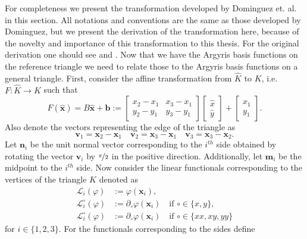 For completeness we present the transformation developed by Dominguez et. al. in
this section. All notations and conventions are the same as those developed by
Dominguez, but we present the derivation of the transformation here, because of
the novelty and importance of this transformation to this thesis. For the
original derivation one should see \cite{Dominguez06} and \cite{Dominguez08}.
Now that we have the Argyris basis functions on the reference triangle we need
to relate those to the Argyris basis functions on a general triangle. First,
consider the affine transformation from $\hat{K}$ to $K$, i.e. $F: \hat{K} \to
K$ such that
\begin{equation}
  F(\hat{\mathbf{x}}) = B\hat{\mathbf{x}} + \mathbf{b} :=
  \begin{bmatrix}
    x_2 - x_1 & x_3 - x_1 \\ y_2 - y_1 & y_3 - y_1
  \end{bmatrix} \begin{bmatrix}
    \hat{x} \\ \hat{y}
  \end{bmatrix} + \begin{bmatrix}
    x_1 \\ y_1
  \end{bmatrix}.
  \label{eqn:Affine}
\end{equation}
Also denote the vectors representing the edge of the triangle as
\begin{equation*}
  \mathbf{v}_1 = \mathbf{x}_2 - \mathbf{x}_1\quad \mathbf{v}_2 = \mathbf{x}_3 -
  \mathbf{x}_1\quad \mathbf{v}_3 = \mathbf{x}_3 - \mathbf{x}_2.
\end{equation*}
Let $\mathbf{n}_i$ be the unit normal vector corresponding to the $i^{th}$ side
obtained by rotating the vector $\mathbf{v}_i$ by $\nicefrac{\pi}{2}$ in the
positive direction. Additionally, let $\mathbf{m}_i$ be the midpoint to the
$i^{th}$ side.  Now consider the linear functionals corresponding to the
vertices of the triangle $K$ denoted as
\begin{align*}
  \mathcal{L}_i(\varphi) &:= \varphi(\mathbf{x}_i), \\
  \mathcal{L}_i^\circ(\varphi) &:= \partial_\circ \varphi(\mathbf{x}_i) \quad
  \text{if }\circ \in
    \{x,y\}, \\
  \mathcal{L}_i^\circ(\varphi) &:= \partial_\circ \varphi(\mathbf{x}_i) \quad
  \text{if }\circ \in
    \{xx,xy,yy\}
\end{align*}
for $i\in \{1,2,3\}$. For the functionals corresponding to the sides define
